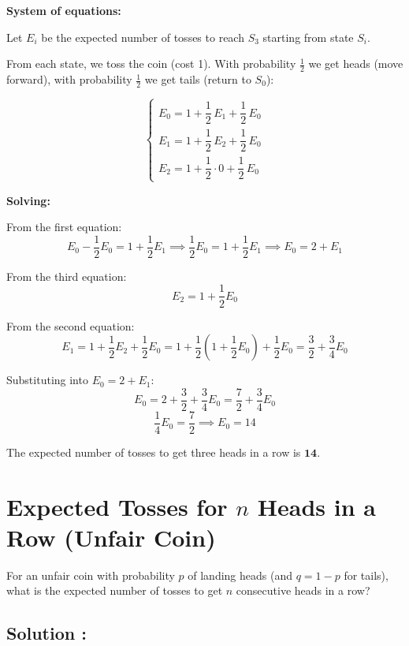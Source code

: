 \bigskip

\textbf{System of equations:}

Let $E_i$ be the expected number of tosses to reach $S_3$ starting from state $S_i$.

From each state, we toss the coin (cost 1). With probability $\frac{1}{2}$ we get heads (move forward), with probability $\frac{1}{2}$ we get tails (return to $S_0$):

\[
\begin{cases}
E_0 = 1 + \dfrac{1}{2}\,E_1 + \dfrac{1}{2}\,E_0 \\[10pt]
E_1 = 1 + \dfrac{1}{2}\,E_2 + \dfrac{1}{2}\,E_0 \\[10pt]
E_2 = 1 + \dfrac{1}{2}\cdot 0 + \dfrac{1}{2}\,E_0
\end{cases}
\]

\textbf{Solving:}

From the first equation:
\[
E_0 - \frac{1}{2}E_0 = 1 + \frac{1}{2}E_1 \implies \frac{1}{2}E_0 = 1 + \frac{1}{2}E_1 \implies E_0 = 2 + E_1
\]

From the third equation:
\[
E_2 = 1 + \frac{1}{2}E_0
\]

From the second equation:
\[
E_1 = 1 + \frac{1}{2}E_2 + \frac{1}{2}E_0 = 1 + \frac{1}{2}\left(1 + \frac{1}{2}E_0\right) + \frac{1}{2}E_0 = \frac{3}{2} + \frac{3}{4}E_0
\]

Substituting into $E_0 = 2 + E_1$:
\[
E_0 = 2 + \frac{3}{2} + \frac{3}{4}E_0 = \frac{7}{2} + \frac{3}{4}E_0
\]
\[
\frac{1}{4}E_0 = \frac{7}{2} \implies \boxed{E_0 = 14}
\]

\bigskip

The expected number of tosses to get three heads in a row is $\mathbf{14}$.


\section{Expected Tosses for $n$ Heads in a Row (Unfair Coin)}

\begin{exerciseBox}
For an unfair coin with probability $p$ of landing heads (and $q = 1-p$ for tails), what is the expected number of tosses to get $n$ consecutive heads in a row?
\end{exerciseBox}



\subsection*{Solution :}

